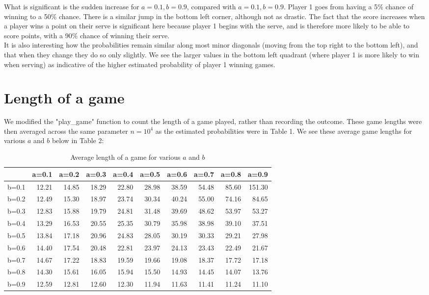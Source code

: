 \documentclass[a4paper, 11pt, oneside]{article}
\begin{document}
What is significant is the sudden increase for $a=0.1, b=0.9$, compared with $a=0.1, b=0.9$. Player 1 goes from having a 5\% chance of winning to a 50\% chance.  There is a similar jump in the bottom left corner, although not as drastic.  The fact that the score increases when a player wins a point on their serve is significant here because player 1 begins with the serve, and is therefore more likely to be able to score points, with a 90\% chance of winning their serve.\\

It is also interesting how the probabilities remain similar along most minor diagonals (moving from the top right to the bottom left), and that when they change they do so only slightly.  We see the larger values in the bottom left quadrant (where player 1 is more likely to win when serving) as indicative of the higher estimated probability of player 1 winning games.


\section{Length of a game}

We modified the "play\_game" function to count the length of a game played, rather than recording the outcome.  These game lengths were then averaged across the same parameter $n=10^4$ as the estimated probabilities were in Table 1.  We see these average game lengths for various $a$ and $b$ below in Table 2:\\


\begin{table}[h]
\centering
\begin{tabular}{r|rrrrrrrrr}
 & a=0.1 & a=0.2 & a=0.3 & a=0.4 & a=0.5 & a=0.6 & a=0.7 & a=0.8 & a=0.9 \\ 
  \hline
   b=0.1 & 12.21 & 14.85 & 18.29 & 22.80 & 28.98 & 38.59 & 54.48 & 85.60 & 151.30 \\ 
   b=0.2 & 12.49 & 15.30 & 18.97 & 23.74 & 30.34 & 40.24 & 55.00 & 74.16 & 84.65 \\ 
   b=0.3 & 12.83 & 15.88 & 19.79 & 24.81 & 31.48 & 39.69 & 48.62 & 53.97 & 53.27 \\ 
   b=0.4 & 13.29 & 16.53 & 20.55 & 25.35 & 30.79 & 35.98 & 38.98 & 39.10 & 37.51 \\ 
   b=0.5 & 13.84 & 17.18 & 20.96 & 24.83 & 28.05 & 30.19 & 30.33 & 29.21 & 27.98 \\ 
   b=0.6 & 14.40 & 17.54 & 20.48 & 22.81 & 23.97 & 24.13 & 23.43 & 22.49 & 21.67 \\ 
   b=0.7 & 14.67 & 17.22 & 18.83 & 19.59 & 19.66 & 19.08 & 18.37 & 17.72 & 17.18 \\ 
   b=0.8 & 14.30 & 15.61 & 16.05 & 15.94 & 15.50 & 14.93 & 14.45 & 14.07 & 13.76 \\ 
   b=0.9 & 12.59 & 12.81 & 12.60 & 12.30 & 11.94 & 11.63 & 11.41 & 11.24 & 11.10 \\ 
\end{tabular}
\caption{Average length of a game for various $a$ and $b$}
\end{table}
\end{document}
